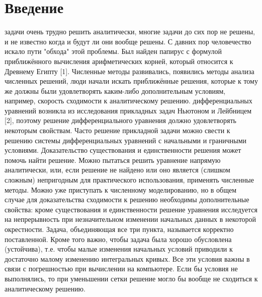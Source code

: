 \documentclass[a4paper,14pt]{article}
\begin{document}
\section{Введение}
 задачи очень трудно решить аналитически, многие задачи до сих пор не решены, и не известно когда и будут ли они вообще решены. С давних пор человечество искало пути "обхода" этой проблемы. Был найден папирус с формулой приближённого вычисления арифметических корней, который относится к Древнему Египту [1]. Численные методы развивались, появились методы анализа численных решений, люди начали искать приближённые решения, которые к тому же должны были удовлетворять каким-либо дополнительным условиям, например, скорость сходимости к аналитическому решению.\newline
{} дифференциальных уравнений возникла из исследования прикладных задач Ньютоном и Лейбницем [2], поэтому решение дифференциального уравнения должно удовлетворять некоторым свойствам.\newline
\indent Часто решение прикладной задачи можно свести к решению системы дифференциальных уравнений с начальными и граничными условиями. Доказательство существования и единственности решения может помочь найти решение. Можно пытаться решить уравнение напрямую аналитически, или, если решение не найдено или оно является (слишком сложным) непригодным для практического использования, применять численные методы. Можно уже приступать к численному моделированию, но в общем случае для доказательства сходимости к решению необходимы дополнительные свойства: кроме существования и единственности решение уравнения исследуется на непрерывность при незначительном изменении начальных данных в некоторой окрестности. Задача, объединяющая все три пункта, называется корректно поставленной.  Кроме того важно, чтобы задача была хорошо обусловлена (устойчива), т.е. чтобы малые изменения начальных условий приводили к достаточно малому изменению интегральных кривых. Все эти условия важны в связи с погрешностью при вычислении на компьютере. Если бы условия не выполнялись, то при уменьшении сетки решение могло бы вообще не сходиться к аналитическому решению.\newline
\end{document}
